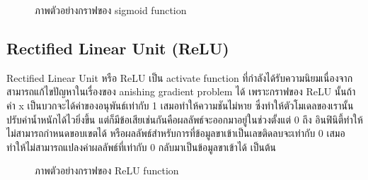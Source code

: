 \documentclass[12pt,oneside,openright,a4paper]{cpe-thai-project}
\begin{document}
\begin{figure}[!ht]\centering
  \setlength{\fboxrule}{0.2mm} %
  \setlength{\fboxsep}{1cm}
  \caption{ภาพตัวอย่างกราฟของ sigmoid function}\label{fig:sigmoid}
\end{figure}

\subsection{Rectified Linear Unit (ReLU)\cite{ReLuFunc}}
Rectified Linear Unit หรือ ReLU เป็น activate function ที่กำลังได้รับความนิยมเนื่องจากสามารถแก้ไขปัญหาในเรื่องของ 
anishing gradient problem ได้ เพราะกราฟของ ReLU นั้นถ้าค่า x เป็นบวกจะได้ค่าของอนุพันธ์เท่ากับ 1 เสมอทำให้ความชันไม่หาย 
ซึ่งทำให้ตัวโมเดลของเรานั้นปรับค่าน้ำหนักได้ไวยิ่งขึ้น แต่ก็มีข้อเสียเช่นกันคือผลลัพธ์จะออกมาอยู่ในช่วงตั้งแต่ 0 ถึง อินฟินิตี้ทำให้ไม่สามารถกำหนดขอบเขตได้ หรือผลลัพธ์สำหรับการที่ข้อมูลขาเข้าเป็นเลขติดลบจะเท่ากับ 
0 เสมอทำให้ไม่สามารถแปลงค่าผลลัพธ์ที่เท่ากับ 0 กลับมาเป็นข้อมูลขาเข้าได้ เป็นต้น 


\begin{figure}[!ht]\centering
  \setlength{\fboxrule}{0.2mm} %
  \setlength{\fboxsep}{1cm}
  \caption{ภาพตัวอย่างกราฟของ ReLU function}\label{fig:relu}
\end{figure}
\end{document}
